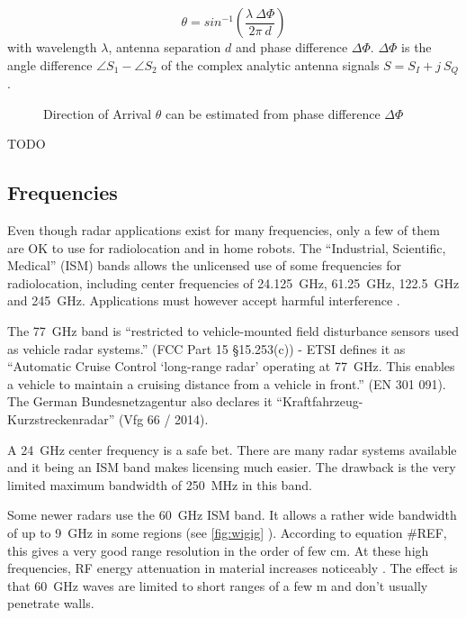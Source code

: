 \begin{equation} \label{eq:doa}
	\theta = sin^{-1}\left({\frac{\lambda~\Delta\Phi}{2\pi ~d}}\right)
\end{equation}
with wavelength \(\lambda\), antenna separation \(d\) and phase
difference \(\Delta\Phi\). \(\Delta\Phi\) is the angle difference
\(\angle S_1 - \angle S_2\) of the complex analytic antenna signals
\(S = S_I + j~S_Q\).

\begin{figure}[htp]
    \centering
    \def\svgwidth{10cm}
    
    \caption{\label{fig:doa}Direction of Arrival \(\theta\) can be estimated from phase difference \(\Delta\Phi\)}
\end{figure}

TODO
\cite{Hacker2010} \cite{Cho2017}

\subsection{Frequencies}\label{frequencies}

Even though radar applications exist for many frequencies, only a few of
them are OK to use for radiolocation and in home robots. The
``Industrial, Scientific, Medical'' (ISM) bands allows the unlicensed
use of some frequencies for radiolocation, including center frequencies
of \SI{24.125}{GHz}, \SI{61.25}{GHz}, \SI{122.5}{GHz} and \SI{245}{GHz}.
Applications must however accept harmful interference \cite{FCC2017}.

The \SI{77}{GHz} band is ``restricted to vehicle-mounted field disturbance
sensors used as vehicle radar systems.'' (FCC Part 15 §15.253(c)) - ETSI
defines it as ``Automatic Cruise Control `long-range radar' operating at
\SI{77}{GHz}. This enables a vehicle to maintain a cruising distance from
a vehicle in front.'' (EN 301 091). The German Bundesnetzagentur also
declares it ``Kraftfahrzeug-Kurzstreckenradar'' (Vfg 66 / 2014).

A \SI{24}{GHz} center frequency is a safe bet. There are many radar
systems available and it being an ISM band makes licensing much easier.
The drawback is the very limited maximum bandwidth of \SI{250}{MHz} in this
band.

Some newer radars use the \SI{60}{GHz} ISM band. It allows a rather wide
bandwidth of up to \SI{9}{GHz} in some regions (see \cref{fig:wigig} ).
According to equation \#REF, this gives a very good range resolution in
the order of few \si{cm}. At these high frequencies, RF energy
attenuation in material increases noticeably \cite{FerrisJr.1998}. The
effect is that \SI{60}{GHz} waves are limited to short ranges of a few
\si{m} and don't usually penetrate walls.


